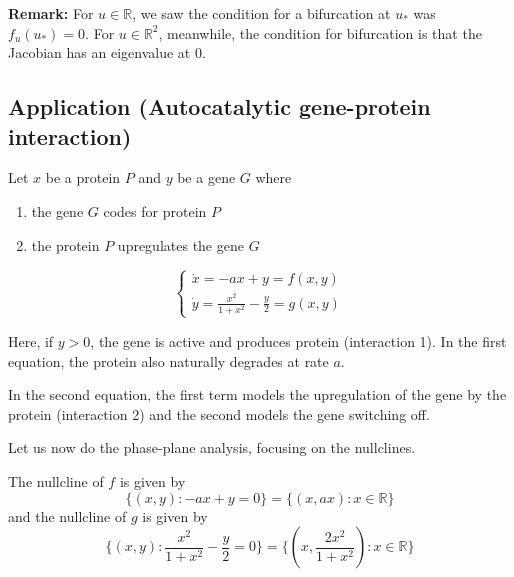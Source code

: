 \documentclass[12pt]{report}
\newcommand{\R}{\mathbb{R}}
\newcommand*{\tbf}[1]{\ifmmode\mathbf{#1}\else\textbf{#1}\fi}
\begin{document}
\tbf{Remark:} For $u \in \R$, we saw the condition for a bifurcation at $u_*$ was $f_u(u_*) = 0$. For $u \in \R^2$, meanwhile, the condition for bifurcation is that the Jacobian has an eigenvalue at $0$.

\subsection{Application (Autocatalytic gene-protein interaction)}
Let $x$ be a protein $P$ and $y$ be a gene $G$ where
\begin{enumerate}
    \item the gene $G$ codes for protein $P$
    \item the protein $P$ upregulates the gene $G$
\end{enumerate}
\[\begin{cases}
        \dot x = -ax + y = f(x, y) \\
        \dot y = \frac{x^2}{1 + x^2} - \frac{y}{2} = g(x, y)
    \end{cases}\]

Here, if $y > 0$, the gene is active and produces protein (interaction 1). In the first equation, the protein also naturally degrades at rate $a$.

In the second equation, the first term models the upregulation of the gene by the protein (interaction 2) and the second models the gene switching off.

Let us now do the phase-plane analysis, focusing on the nullclines.

The nullcline of $f$ is given by
\[\{(x, y): -ax + y = 0\} = \{(x, ax): x \in \R\}\]
and the nullcline of $g$ is given by
\[\{(x, y): \frac{x^2}{1 + x^2} - \frac{y}{2} = 0\} = \{(x, \frac{2x^2}{1 + x^2}): x \in \R\}\]
\end{document}
